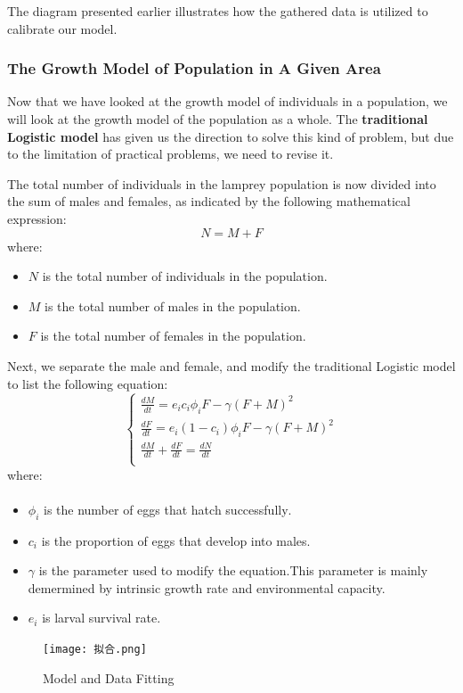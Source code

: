 \documentclass[12pt]{article}  %
\newcommand{\upcite}[1]{\textsuperscript{\textsuperscript{\cite{#1}}}}
\begin{document}
The diagram presented earlier illustrates how the gathered data is utilized to calibrate our model.
\subsubsection{The Growth Model of Population in A Given Area}

Now that we have looked at the growth model of individuals in a population, we will look at the growth model of the population as a whole.  The \textbf{traditional Logistic model} has given us the direction to solve this kind of problem, but due to the limitation of practical problems, we need to revise it.

The total number of individuals in the lamprey population is now divided into the sum of males and females, as indicated by the following mathematical expression:
\begin{equation}
	N=M+F
\end{equation}
where:
\begin{itemize}
	\setlength{\parsep}{0ex} %
	\setlength{\topsep}{2ex} %
	\setlength{\itemsep}{1ex} %
	\item $N$  is the total number of individuals in the population.
	\item $M$  is the total number of males in the population.
	\item $F$ is the total number of females in the population.
\end{itemize}

Next, we separate the male and female, and modify the traditional Logistic model to list the following equation:
	\begin{equation}
		\begin{cases}
			\frac{dM}{dt}=e_{i}c_i\phi _iF-\gamma \left( F+M \right) ^2\\
			\frac{dF}{dt}=e_{i}\left( 1-c_i \right) \phi _iF-\gamma \left( F+M \right) ^2\\
			\frac{dM}{dt}+\frac{dF}{dt}=\frac{dN}{dt}\\
		\end{cases}
	\end{equation}
where:
\begin{itemize}
	\setlength{\parsep}{0ex} %
	\setlength{\topsep}{2ex} %
	\setlength{\itemsep}{1ex} %
	\item $\phi_{i}$ is the number of eggs that hatch successfully\upcite{3,4}.
	\item $c_{i}$  is the proportion of eggs that develop into males.
	\item $\gamma$ is the parameter used to modify the equation.This parameter is mainly demermined by intrinsic growth rate and environmental capacity. 
	\item  $e_{i}$ is larval survival rate.
\end{itemize}
\begin{figure}[H]  %
	\centering  %
	\texttt{[image: 拟合.png]} %
	\caption{Model and Data Fitting}
\end{figure}
\end{document}
